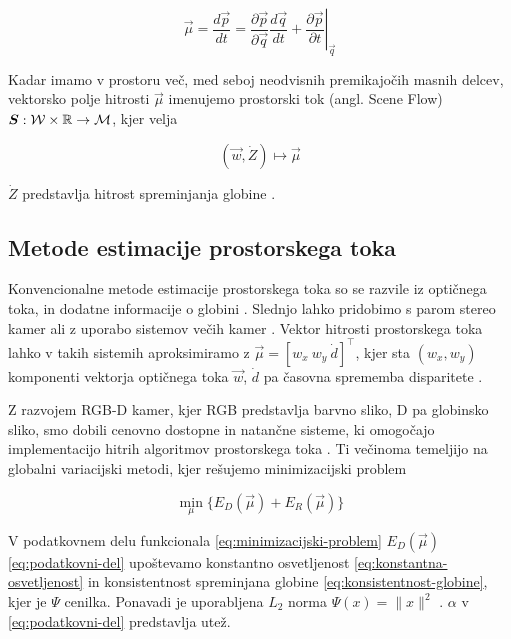 \begin{equation}\label{eq:scene-flow}
	\vec{\mu} = \frac{d\vec{p}}{dt} = \frac{\partial \vec{p}}{\partial \vec{q}} \frac{d\vec{q}}{dt} + \left.\frac{\partial \vec{p}}{\partial t}\right|_{\vec{q}}
\end{equation}

Kadar imamo v prostoru več, med seboj neodvisnih premikajočih masnih delcev, vektorsko polje hitrosti $\vec{\mu}$ imenujemo prostorski tok (angl. Scene Flow) ${\boldsymbol{S}}: \mathcal{W} \times \mathbb{R} \to \mathcal{M}$, kjer velja

\begin{equation}
(\vec{w}, \dot{Z}) \mapsto \vec{\mu}
\label{eq:of-sf}
\end{equation}



$\dot{Z}$ predstavlja hitrost spreminjanja globine \cite{yan2016scene}.

\subsection{Metode estimacije prostorskega toka}
Konvencionalne metode estimacije prostorskega toka so se razvile iz optičnega toka, in dodatne informacije o globini \cite{yan2016scene}. Slednjo lahko pridobimo s parom stereo kamer ali z uporabo sistemov večih kamer \cite{jaimez2015primal}. Vektor hitrosti prostorskega toka lahko v takih sistemih aproksimiramo z $\vec{\mu} = \left[w_x~w_y~\dot{d}\right]^\top$, kjer sta $(w_x, w_y)$ komponenti vektorja optičnega toka $\vec{w}$, $\dot{d}$ pa časovna sprememba disparitete \cite{yan2016scene}.

Z razvojem RGB-D kamer, kjer RGB predstavlja barvno sliko, D pa globinsko sliko, smo dobili cenovno dostopne in natančne sisteme, ki omogočajo implementacijo hitrih algoritmov prostorskega toka \cite{yan2016scene,jaimez2015primal}. Ti večinoma temeljijo na globalni variacijski metodi, kjer rešujemo minimizacijski problem 

\begin{equation}\label{eq:minimizacijski-problem}
	\min_{\mu}\{E_D(\vec{\mu}) + E_R(\vec{\mu})\}
\end{equation}

V podatkovnem delu funkcionala \eqref{eq:minimizacijski-problem} $E_D(\vec{\mu})$ \eqref{eq:podatkovni-del} upoštevamo konstantno osvetljenost \eqref{eq:konstantna-osvetljenost} in konsistentnost spreminjana globine \eqref{eq:konsistentnost-globine}, kjer je  $\Psi$ cenilka. Ponavadi je uporabljena $L_2$ norma $\Psi(x) = \| x \|^2$ \cite{yan2016scene}. $\alpha$ v \eqref{eq:podatkovni-del} predstavlja utež.

